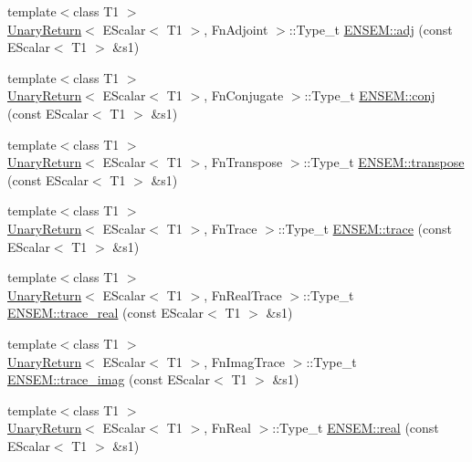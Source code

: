 \begin{DoxyCompactItemize}
\item 
{\footnotesize template$<$class T1 $>$ }\\\mbox{\hyperlink{structUnaryReturn}{Unary\+Return}}$<$ E\+Scalar$<$ T1 $>$, Fn\+Adjoint $>$\+::Type\+\_\+t \mbox{\hyperlink{group__escalar_ga51071562edd203962f48e4b44f0c0a0c}{E\+N\+S\+E\+M\+::adj}} (const E\+Scalar$<$ T1 $>$ \&s1)
\item 
{\footnotesize template$<$class T1 $>$ }\\\mbox{\hyperlink{structUnaryReturn}{Unary\+Return}}$<$ E\+Scalar$<$ T1 $>$, Fn\+Conjugate $>$\+::Type\+\_\+t \mbox{\hyperlink{group__escalar_ga291c7e9b7f872b3e6db0d75ff3421b6a}{E\+N\+S\+E\+M\+::conj}} (const E\+Scalar$<$ T1 $>$ \&s1)
\item 
{\footnotesize template$<$class T1 $>$ }\\\mbox{\hyperlink{structUnaryReturn}{Unary\+Return}}$<$ E\+Scalar$<$ T1 $>$, Fn\+Transpose $>$\+::Type\+\_\+t \mbox{\hyperlink{group__escalar_ga5b02d7d8a00b851a2452fb03861a9401}{E\+N\+S\+E\+M\+::transpose}} (const E\+Scalar$<$ T1 $>$ \&s1)
\item 
{\footnotesize template$<$class T1 $>$ }\\\mbox{\hyperlink{structUnaryReturn}{Unary\+Return}}$<$ E\+Scalar$<$ T1 $>$, Fn\+Trace $>$\+::Type\+\_\+t \mbox{\hyperlink{group__escalar_ga4c3bf5ecccbf7b690868af26ec7d8ca6}{E\+N\+S\+E\+M\+::trace}} (const E\+Scalar$<$ T1 $>$ \&s1)
\item 
{\footnotesize template$<$class T1 $>$ }\\\mbox{\hyperlink{structUnaryReturn}{Unary\+Return}}$<$ E\+Scalar$<$ T1 $>$, Fn\+Real\+Trace $>$\+::Type\+\_\+t \mbox{\hyperlink{group__escalar_gac6853fb7b9f9b61b97cda696c804ab0a}{E\+N\+S\+E\+M\+::trace\+\_\+real}} (const E\+Scalar$<$ T1 $>$ \&s1)
\item 
{\footnotesize template$<$class T1 $>$ }\\\mbox{\hyperlink{structUnaryReturn}{Unary\+Return}}$<$ E\+Scalar$<$ T1 $>$, Fn\+Imag\+Trace $>$\+::Type\+\_\+t \mbox{\hyperlink{group__escalar_gad2c4bd25b83ec8aa100ff58b6b773d8c}{E\+N\+S\+E\+M\+::trace\+\_\+imag}} (const E\+Scalar$<$ T1 $>$ \&s1)
\item 
{\footnotesize template$<$class T1 $>$ }\\\mbox{\hyperlink{structUnaryReturn}{Unary\+Return}}$<$ E\+Scalar$<$ T1 $>$, Fn\+Real $>$\+::Type\+\_\+t \mbox{\hyperlink{group__escalar_gae1f319d978abc1631bd68382787544aa}{E\+N\+S\+E\+M\+::real}} (const E\+Scalar$<$ T1 $>$ \&s1)
\item 

\end{DoxyCompactItemize}
